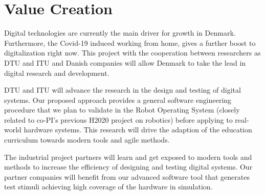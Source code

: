 \documentclass[fleqn,12pt]{article}
\begin{document}







\section*{Value Creation}


Digital technologies are currently the main driver for growth in Denmark.
Furthermore, the Covid-19 induced working from home, gives a further boost to digitalization right now.
This project with the cooperation between researchers as DTU and ITU and
Danish companies will allow Denmark to take the lead in digital research and development.


DTU and ITU will advance the research in the design and testing of
digital systems. Our proposed approach provides a general software
engineering procedure that we plan to validate in the Robot Operating
System (closely related to co-PI's previous H2020 project on robotics) before
applying to real-world hardware systems.
This research will drive the adaption of the education curriculum towards modern tools and agile methods.



The industrial project partners will learn and get exposed to modern tools and methods to increase the efficiency of designing and testing digital systems. Our partner companies will benefit from our advanced software tool that generates test stimuli achieving high coverage of the hardware in simulation.
\end{document}
